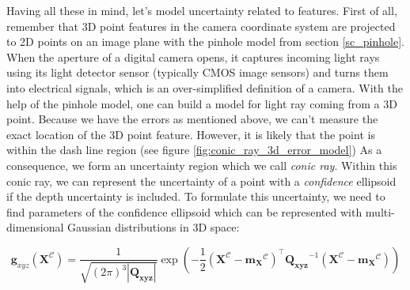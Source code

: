 \documentclass[a4paper]{report}
\numberwithin{figure}{section}
\begin{document}
Having all these in mind, let's model uncertainty related to features.  First
of all, remember that 3D point features in the camera coordinate system are
projected to 2D points on an image plane with the pinhole model from section
\ref{sc_pinhole}.  When the aperture of a digital camera opens, it captures
incoming light rays using its light detector sensor (typically CMOS image
sensors) and turns them into electrical signals, which is an over-simplified
definition of a camera. With the help of the pinhole model, one can build a
model for light ray coming from a 3D point.  Because we have the errors as
mentioned above, we can't measure the exact location of the 3D point feature.
However, it is likely that the point is within the dash line region (see figure
\ref{fig:conic_ray_3d_error_model}) As a consequence, we form an uncertainty
region which we call \textit{conic ray}.  Within this conic ray, we can
represent the uncertainty of a point with a \textit{confidence} ellipsoid if
the depth uncertainty is included.  To formulate this uncertainty, we need to
find parameters of the confidence ellipsoid which can be represented with
multi-dimensional Gaussian distributions in 3D space:

\begin{equation} \mathbf{g}_{xyz}(\mathbf{X}^{\mathcal{C}}) =
\frac{1}{\sqrt{(2\pi)^3|\mathbf{Q_{xyz}}|}} \exp(-\frac{1}{2}
(\mathbf{X}^{\mathcal{C}}-\mathbf{m_X}^{\mathcal{C}})^\intercal
\mathbf{Q_{xyz}}^{-1} (\mathbf{X}^{\mathcal{C}}-\mathbf{m_X}^{\mathcal{C}}))
\end{equation} \label{eq:cov_ellipse}
\end{document}
